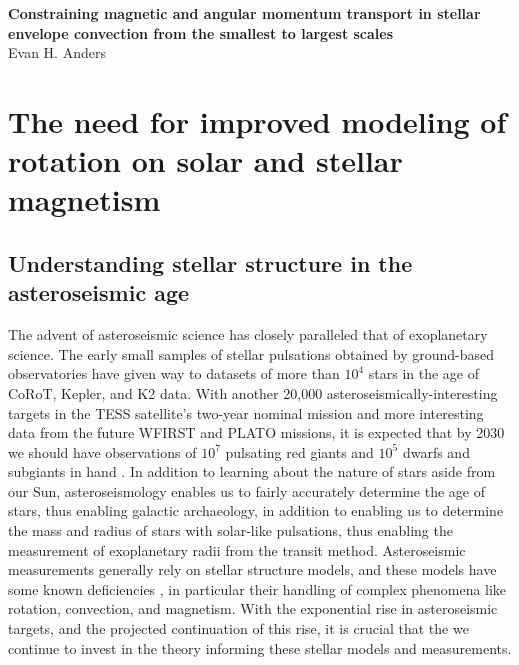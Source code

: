 \documentclass[aasms,12pt]{article}
\begin{document}
\begin{center}
   \large\textbf{Constraining magnetic and angular momentum transport in stellar envelope convection from the smallest to largest scales}\\
   \vspace{0.2cm}
   \large{Evan H. Anders}\\
   \vspace{0.2cm}
\end{center}

\vspace{-0.6cm}

\section{The need for improved modeling of rotation on solar and stellar magnetism}

\subsection{Understanding stellar structure in the asteroseismic age}
The advent of asteroseismic science has closely paralleled that of exoplanetary science.
The early small samples of stellar pulsations obtained by ground-based observatories \citep[e.g.,][and others]{kjeldsen&frandsen1991, bouchy&carrier2001, bedding&all2001} have given way to datasets of more than $10^4$ stars \citep[e.g.,][]{yu&all2018, santos&all2019b} in the age of CoRoT, Kepler, and K2 data.
With another 20,000 asteroseismically-interesting targets in the TESS satellite's two-year nominal mission \citep{schofield&all2019} and more interesting data from the future WFIRST and PLATO missions, it is expected that by 2030 we should have observations of $10^7$ pulsating red giants and $10^5$ dwarfs and subgiants in hand  \citep{huber&all2019}.
In addition to learning about the nature of stars aside from our Sun, asteroseismology enables us to fairly accurately determine the age of stars, thus enabling galactic archaeology, in addition to enabling us to determine the mass and radius of stars with solar-like pulsations, thus enabling the measurement of exoplanetary radii from the transit method.
Asteroseismic measurements generally rely on stellar structure models, and these models have some known deficiencies \citep{buldgen2019}, in particular their handling of complex phenomena like rotation, convection, and magnetism.
With the exponential rise in asteroseismic targets, and the projected continuation of this rise, it is crucial that the we continue to invest in the theory informing these stellar models and measurements.
\end{document}
